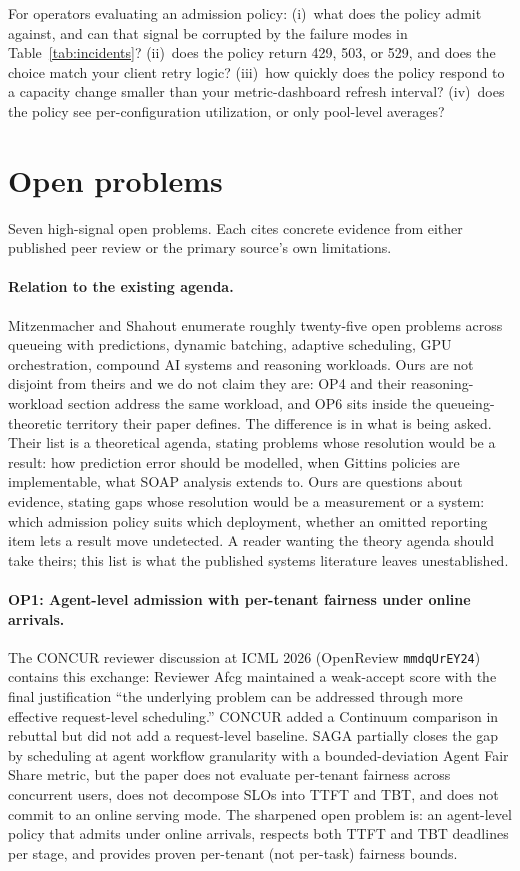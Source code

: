 For operators evaluating an admission policy: (i)~what does the policy
admit against, and can that signal be corrupted by the failure modes
in Table~\ref{tab:incidents}? (ii)~does the policy return 429, 503, or
529, and does the choice match your client retry logic? (iii)~how
quickly does the policy respond to a capacity change smaller than your
metric-dashboard refresh interval? (iv)~does the policy see
per-configuration utilization, or only pool-level averages?

\section{Open problems}
\label{sec:open}

Seven high-signal open problems. Each cites concrete evidence from
either published peer review or the primary source's own limitations.

\paragraph{Relation to the existing agenda.} Mitzenmacher and Shahout
\citep{mitzenmacher2025queueing} enumerate roughly twenty-five open
problems across queueing with predictions, dynamic batching, adaptive
scheduling, GPU orchestration, compound AI systems and reasoning
workloads. Ours are not disjoint from theirs and we do not claim they
are: OP4 and their reasoning-workload section address the same
workload, and OP6 sits inside the queueing-theoretic territory their
paper defines. The difference is in what is being asked. Their list is
a theoretical agenda, stating problems whose resolution would be a
result: how prediction error should be modelled, when Gittins policies
are implementable, what SOAP analysis extends to. Ours are questions
about evidence, stating gaps whose resolution would be a measurement or
a system: which admission policy suits which deployment, whether an
omitted reporting item lets a result move undetected. A reader wanting
the theory agenda should take theirs; this list is what the published
systems literature leaves unestablished.

\paragraph{OP1: Agent-level admission with per-tenant fairness under online arrivals.}
The CONCUR reviewer discussion at ICML 2026 (OpenReview
\texttt{mmdqUrEY24}) contains this exchange: Reviewer Afcg maintained
a weak-accept score with the final justification ``the underlying
problem can be addressed through more effective request-level
scheduling.'' CONCUR added a Continuum comparison in rebuttal but did
not add a request-level baseline. SAGA
\citep{guo2026saga} partially closes the gap by scheduling at agent
workflow granularity with a bounded-deviation Agent Fair Share
metric, but the paper does not evaluate per-tenant fairness across
concurrent users, does not decompose SLOs into TTFT and TBT, and
does not commit to an online serving mode. The sharpened open
problem is: an agent-level policy that admits under online arrivals,
respects both TTFT and TBT deadlines per stage, and provides
proven per-tenant (not per-task) fairness bounds.

